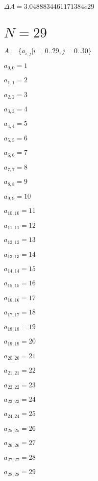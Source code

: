 \documentclass[a4paper,12pt]{article}
\begin{document}
$\Delta A = 3.0488834461171384e29$



\section{ $N = 29$ }
$A = \{ a _{ i, j } | i = \overline { 0..29 }, j = \overline { 0..30 } \}$

$a _{ 0, 0 } = 1$

$a _{ 1, 1 } = 2$

$a _{ 2, 2 } = 3$

$a _{ 3, 3 } = 4$

$a _{ 4, 4 } = 5$

$a _{ 5, 5 } = 6$

$a _{ 6, 6 } = 7$

$a _{ 7, 7 } = 8$

$a _{ 8, 8 } = 9$

$a _{ 9, 9 } = 10$

$a _{ 10, 10 } = 11$

$a _{ 11, 11 } = 12$

$a _{ 12, 12 } = 13$

$a _{ 13, 13 } = 14$

$a _{ 14, 14 } = 15$

$a _{ 15, 15 } = 16$

$a _{ 16, 16 } = 17$

$a _{ 17, 17 } = 18$

$a _{ 18, 18 } = 19$

$a _{ 19, 19 } = 20$

$a _{ 20, 20 } = 21$

$a _{ 21, 21 } = 22$

$a _{ 22, 22 } = 23$

$a _{ 23, 23 } = 24$

$a _{ 24, 24 } = 25$

$a _{ 25, 25 } = 26$

$a _{ 26, 26 } = 27$

$a _{ 27, 27 } = 28$

$a _{ 28, 28 } = 29$
\end{document}
